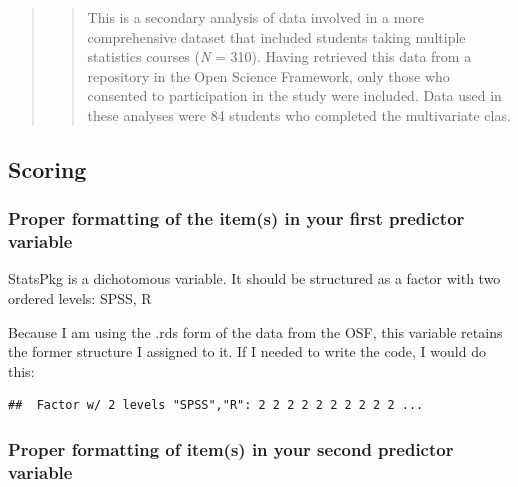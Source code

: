 \documentclass[
  11pt,
]{book}
\newenvironment{Shaded}{\begin{snugshade}}{\end{snugshade}}
\newcommand{\AttributeTok}[1]{\textcolor[rgb]{0.27,0.27,0.27}{#1}}
\newcommand{\FunctionTok}[1]{\textcolor[rgb]{0.27,0.27,0.27}{\textbf{#1}}}
\newcommand{\NormalTok}[1]{#1}
\newcommand{\OtherTok}[1]{\textcolor[rgb]{0.37,0.37,0.37}{#1}}
\newcommand{\SpecialCharTok}[1]{\textcolor[rgb]{0.43,0.43,0.43}{\textbf{#1}}}
\newcommand{\StringTok}[1]{\textcolor[rgb]{0.5,0.5,0.5}{#1}}
\begin{document}
\begin{quote}
\begin{quote}
This is a secondary analysis of data involved in a more comprehensive dataset that included students taking multiple statistics courses (\emph{N} = 310). Having retrieved this data from a repository in the Open Science Framework, only those who consented to participation in the study were included. Data used in these analyses were 84 students who completed the multivariate clas.
\end{quote}
\end{quote}

\hypertarget{scoring-1}{%
\subsection{Scoring}\label{scoring-1}}

\hypertarget{proper-formatting-of-the-items-in-your-first-predictor-variable}{%
\subsubsection*{Proper formatting of the item(s) in your first predictor variable}\label{proper-formatting-of-the-items-in-your-first-predictor-variable}}


StatsPkg is a dichotomous variable. It should be structured as a factor with two ordered levels: SPSS, R

Because I am using the .rds form of the data from the OSF, this variable retains the former structure I assigned to it. If I needed to write the code, I would do this:

\begin{Shaded}
\end{Shaded}

\begin{verbatim}
##  Factor w/ 2 levels "SPSS","R": 2 2 2 2 2 2 2 2 2 2 ...
\end{verbatim}

\hypertarget{proper-formatting-of-items-in-your-second-predictor-variable}{%
\subsubsection*{Proper formatting of item(s) in your second predictor variable}\label{proper-formatting-of-items-in-your-second-predictor-variable}}
\end{document}
